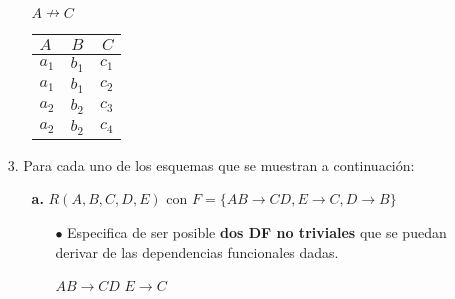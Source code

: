\documentclass[12pt, letterpaper]{article}
\begin{document}
\begin{itemize}
\begin{itemize}
\begin{multicols}{2}
                                        $A \nrightarrow C$
                                        \begin{tabular}{| l | c | r |}
                                            \hline
                                            $A$ & $B$ & $C$ \\
                                            \hline 
                                            $a_{1}$ & $b_{1}$ & $c_{1}$ \\
                                            $a_{1}$ & $b_{1}$ & $c_{2}$ \\
                                            $a_{2}$ & $b_{2}$& $c_{3}$ \\
                                            $a_{2}$ & $b_{2}$ & $c_{4}$ \\
                                            \hline
                                        \end{tabular}

                                \end{multicols}

                                
            \end{itemize} \vspace{.3cm}
        
        \item[3.]   Para cada uno de los esquemas que se muestran a continuación:

            \begin{itemize}

                \item[\textbf{a.}]  $R(A,B,C,D,E)$ con $F = \{AB\rightarrow CD, 
                                    E \rightarrow C, D \rightarrow B\}$

                    \begin{itemize}

                        \item[$\bullet$]    Especifica de ser posible \textbf{dos 
                                            DF no triviales} que se puedan derivar 
                                            de las dependencias funcionales dadas.

                                            \begin{center}
                                                $AB \rightarrow CD$ \hspace{.5cm} $E \rightarrow C$
                                            \end{center}


\end{itemize}
\end{itemize}
\end{itemize}
\end{document}
